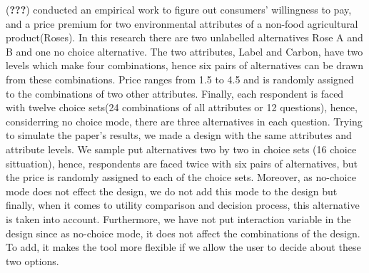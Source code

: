 \documentclass[11pt,]{article}
\begin{document}
({\textbf{???}}) conducted an empirical work to figure out consumers'
willingness to pay, and a price premium for two environmental attributes
of a non-food agricultural product(Roses). In this research there are
two unlabelled alternatives Rose A and B and one no choice alternative.
The two attributes, Label and Carbon, have two levels which make four
combinations, hence six pairs of alternatives can be drawn from these
combinations. Price ranges from 1.5 to 4.5 and is randomly assigned to
the combinations of two other attributes. Finally, each respondent is
faced with twelve choice sets(24 combinations of all attributes or 12
questions), hence, considerring no choice mode, there are three
alternatives in each question. Trying to simulate the paper's results,
we made a design with the same attributes and attribute levels. We
sample put alternatives two by two in choice sets (16 choice
sittuation), hence, respondents are faced twice with six pairs of
alternatives, but the price is randomly assigned to each of the choice
sets. Moreover, as no-choice mode does not effect the design, we do not
add this mode to the design but finally, when it comes to utility
comparison and decision process, this alternative is taken into account.
Furthermore, we have not put interaction variable in the design since as
no-choice mode, it does not affect the combinations of the design. To
add, it makes the tool more flexible if we allow the user to decide
about these two options.
\end{document}
